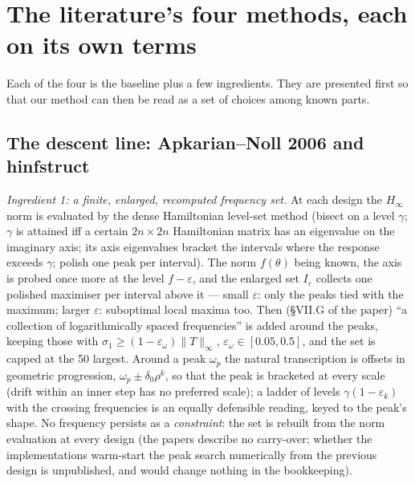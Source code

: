 \documentclass[11pt,a4paper]{article}
\newcommand{\eps}{\varepsilon}
\newcommand{\rev}[1]{#1}
\newcommand{\revb}[1]{#1}
\newcommand{\revc}[1]{#1}
\begin{document}
\section{The literature's four methods, each on its own terms}
\label{sec:lit}

\revc{Each of the four} is the baseline plus a few ingredients.  They are presented first so
that our method can then be read as a set of choices among known parts.

\subsection{The descent line: Apkarian--Noll 2006 and \textsf{hinfstruct}}
\label{sec:descent}
\emph{Ingredient 1: a finite, enlarged, recomputed frequency set.}  At each design the
$H_\infty$ norm is evaluated by the dense Hamiltonian level-set method (bisect on a level
$\gamma$; $\gamma$ is attained iff a certain $2n\times2n$ Hamiltonian matrix has an
eigenvalue on the imaginary axis; its axis eigenvalues bracket the intervals where the
response exceeds $\gamma$; polish one peak per interval).  The norm $f(\theta)$ being
known, the axis is probed once more at the level $f-\eps$, and the enlarged set
$I_\eps$ collects one polished maximiser per interval above it --- small $\eps$: only
the peaks tied with the maximum; larger $\eps$: suboptimal local maxima too.  Then
(\S VII.G of the paper) ``a collection of logarithmically spaced frequencies'' is added
around the peaks, keeping those with $\sigma_1\ge(1-\eps_\omega)\|T\|_\infty$,
$\eps_\omega\in[0.05,0.5]$, and the set is capped at the 50 largest.  Around a peak
$\omega_p$ the natural transcription is offsets in geometric progression,
$\omega_p\pm\delta_0\rho^k$, so that the peak is bracketed at every scale (drift within
an inner step has no preferred scale); a ladder of levels $\gamma(1-\eps_k)$ with the
crossing frequencies is an equally defensible reading, keyed to the peak's shape.
\rev{No frequency persists as a \emph{constraint}: the set is rebuilt from the norm
evaluation at every design \revb{(the papers describe no carry-over; whether the implementations warm-start the
peak search numerically from the previous design is unpublished, and would change
nothing in the bookkeeping).}}
\end{document}
